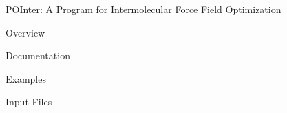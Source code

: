 \begin{chapter}{POInter: A Program for Intermolecular Force Field Optimization}
\label{ch:pointer}

\begin{section}{Overview}

\end{section}

\begin{section}{Documentation}
\end{section}

\begin{section}{Examples}
\end{section}

\begin{subappendices}
\begin{section}{Input Files}

\end{section}
\end{subappendices}

\end{chapter}
